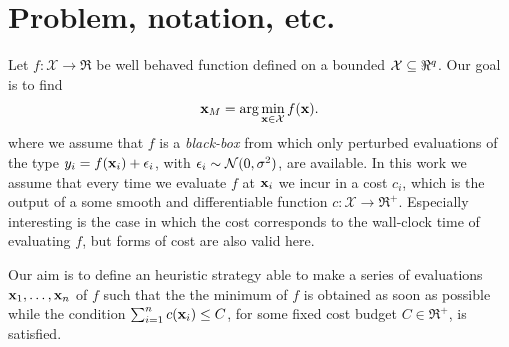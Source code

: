 \documentclass{article} %
\begin{document}


\section{Problem, notation, etc.}


Let $f: {\mathcal X} \to \Re$ be well behaved function defined on a bounded ${\mathcal X} \subseteq \Re^{q}$. Our goal is to find 
$$\mathbf{x}_{M} = \arg \min_{\mathbf{x} \in {\mathcal X}} f(\mathbf{x}).$$ 
where we  assume that $f$ is a \emph{black-box} from which only perturbed evaluations of the type $y_i = f(\mathbf{x}_i) + \epsilon_i$, with $\epsilon_i \sim\mathcal{N}(0,\sigma^2)$, are  available.  In this work we assume that every time we evaluate $f$ at $\mathbf{x}_i$ we incur in a cost $c_i$, which is the output of a some smooth and differentiable function  $c: {\mathcal X} \to \Re^{+}$. Especially interesting is the case in which the cost corresponds to the wall-clock time of evaluating $f$, but forms of cost are also valid here.

Our aim is to define  an heuristic strategy able to make a series of evaluations $\mathbf{x}_1,\dots,\mathbf{x}_n$ of $f$ such that the the minimum of $f$ is obtained as soon as possible while the condition $\sum_{i=1}^n c(\mathbf{x}_i) \leq C$, for some fixed cost budget $C \in \Re^+$, is satisfied.
\end{document}
